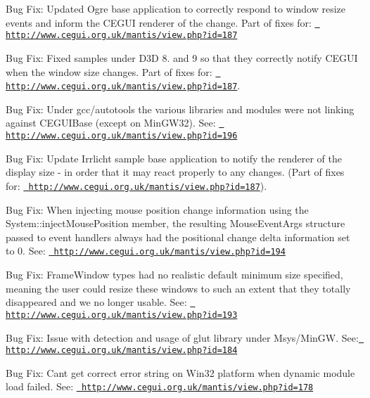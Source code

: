 \begin{DoxyItemize}
\item Bug Fix\+: Updated Ogre base application to correctly respond to window resize events and inform the C\+E\+G\+UI renderer of the change. Part of fixes for\+: \href{http://www.cegui.org.uk/mantis/view.php?id=187}{\texttt{ http\+://www.\+cegui.\+org.\+uk/mantis/view.\+php?id=187}}
\item Bug Fix\+: Fixed samples under D3D 8. and 9 so that they correctly notify C\+E\+G\+UI when the window size changes. Part of fixes for\+: \href{http://www.cegui.org.uk/mantis/view.php?id=187}{\texttt{ http\+://www.\+cegui.\+org.\+uk/mantis/view.\+php?id=187}}.
\item Bug Fix\+: Under gcc/autotools the various libraries and modules were not linking against C\+E\+G\+U\+I\+Base (except on Min\+G\+W32). See\+: \href{http://www.cegui.org.uk/mantis/view.php?id=196}{\texttt{ http\+://www.\+cegui.\+org.\+uk/mantis/view.\+php?id=196}}
\item Bug Fix\+: Update Irrlicht sample base application to notify the renderer of the display size -\/ in order that it may react properly to any changes. (Part of fixes for\+: \href{http://www.cegui.org.uk/mantis/view.php?id=187}{\texttt{ http\+://www.\+cegui.\+org.\+uk/mantis/view.\+php?id=187}}).
\item Bug Fix\+: When injecting mouse position change information using the System\+::inject\+Mouse\+Position member, the resulting Mouse\+Event\+Args structure passed to event handlers always had the positional change delta information set to 0. See\+: \href{http://www.cegui.org.uk/mantis/view.php?id=194}{\texttt{ http\+://www.\+cegui.\+org.\+uk/mantis/view.\+php?id=194}}
\item Bug Fix\+: Frame\+Window types had no realistic default minimum size specified, meaning the user could resize these windows to such an extent that they totally disappeared and we no longer usable. See\+: \href{http://www.cegui.org.uk/mantis/view.php?id=193}{\texttt{ http\+://www.\+cegui.\+org.\+uk/mantis/view.\+php?id=193}}
\item Bug Fix\+: Issue with detection and usage of glut library under Msys/\+Min\+GW. See\+: \href{http://www.cegui.org.uk/mantis/view.php?id=184}{\texttt{ http\+://www.\+cegui.\+org.\+uk/mantis/view.\+php?id=184}}
\item Bug Fix\+: Can\textquotesingle{}t get correct error string on Win32 platform when dynamic module load failed. See\+: \href{http://www.cegui.org.uk/mantis/view.php?id=178}{\texttt{ http\+://www.\+cegui.\+org.\+uk/mantis/view.\+php?id=178}}

\end{DoxyItemize}
